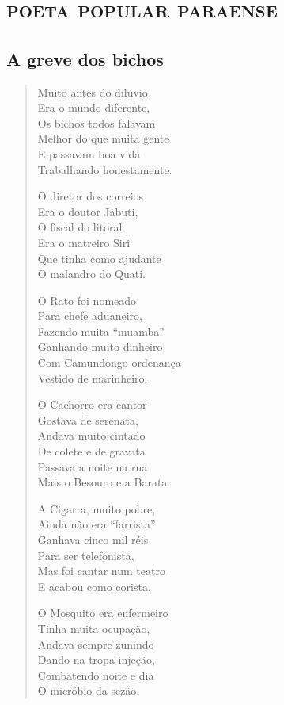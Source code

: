 \part{\textsc{poeta popular paraense}}

\chapter{A greve dos bichos}

\begin{verse}
Muito antes do dilúvio\\
Era o mundo diferente,\\
Os bichos todos falavam\\
Melhor do que muita gente\\
E passavam boa vida\\
Trabalhando honestamente.

O diretor dos correios\\
Era o doutor Jabuti,\\
O fiscal do litoral\\
Era o matreiro Siri\\
Que tinha como ajudante\\
O malandro do Quati.

O Rato foi nomeado\\
Para chefe aduaneiro,\\
Fazendo muita “muamba”\\
Ganhando muito dinheiro\\
Com Camundongo ordenança\\
Vestido de marinheiro.

O Cachorro era cantor\\
Gostava de serenata,\\
Andava muito cintado\\
De colete e de gravata\\
Passava a noite na rua\\
Mais o Besouro e a Barata.

A Cigarra, muito pobre,\\
Ainda não era “farrista”\\
Ganhava cinco mil réis\\
Para ser telefonista, \\
Mas foi cantar num teatro\\
E acabou como corista.

O Mosquito era enfermeiro\\
Tinha muita ocupação,\\
Andava sempre zunindo\\
Dando na tropa injeção,\\
Combatendo noite e dia\\
O micróbio da sezão.


\end{verse}
